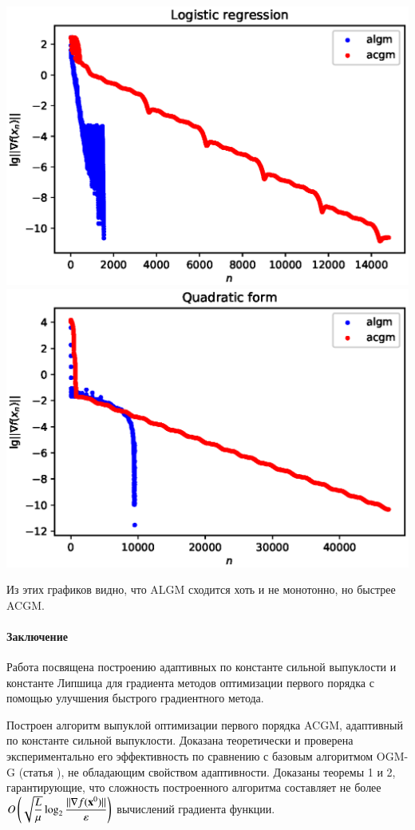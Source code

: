 \documentclass{crm-article}
\begin{document}
\noindent
\includegraphics[scale=0.5]{plots/algm_acgm1.eps}
\includegraphics[scale=0.5]{plots/algm_acgm2.eps}

Из этих графиков видно, что ALGM сходится хоть и не монотонно, но быстрее ACGM. 

\paragraph{Заключение}

Работа посвящена построению адаптивных по константе сильной выпуклости и константе Липшица для градиента методов оптимизации первого порядка с помощью улучшения быстрого градиентного метода.

Построен алгоритм выпуклой оптимизации первого порядка ACGM, адаптивный по константе сильной выпуклости. Доказана теоретически и проверена экспериментально его эффективность по сравнению с базовым алгоритмом OGM-G (статья \cite{kim2018fessler}), не обладающим свойством адаптивности. Доказаны теоремы 1 и 2, гарантирующие, что сложность построенного алгоритма составляет не более $O\left(\sqrt{\dfrac{L}{\mu}}\log_2\dfrac{||\nabla f({\bf x}^0)||}{\varepsilon}\right)$ вычислений градиента функции.
\end{document}
